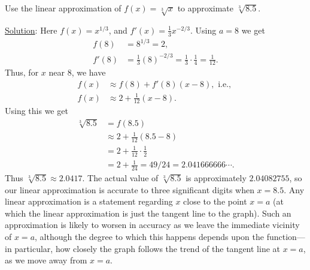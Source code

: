 \bex Use the linear approximation of $f(x)=\sqrt[3]{x}$ to
approximate $\sqrt[3]{8.5}$.

\underline{Solution}: Here $f(x)=x^{1/3}$, and $f'(x)=\frac13x^{-2/3}$.
Using $a=8$ we get 
\begin{align*}
f(8)&=8^{1/3}=2,\\ f'(8)&=\frac13(8)^{-2/3}=
   \frac13\cdot\frac14=\frac1{12}.\end{align*}
Thus, for $x$ near $8$, we have
\begin{align*}
  f(x)&\approx f(8)+f'(8)(x-8),\text{ i.e., }\\
  f(x)&\approx 2+\frac1{12}(x-8).\end{align*}
Using this we get
  \begin{align*}
\sqrt[3]{8.5}&=f(8.5)\\
          &\approx 2+\frac1{12}(8.5-8)\\
          &=2+\frac{1}{12}\cdot\frac12\\  
          &=2+\frac1{24}=49/24=2.041666666\cdots.\end{align*}
Thus $\sqrt[3]{8.5}\approx 2.0417$.
\eex
The actual value of $\sqrt[3]{8.5}$ is approximately $2.04082755$,
so our linear approximation is accurate to three significant digits
when $x=8.5$. Any linear approximation is a statement regarding
$x$ close to the point $x=a$ (at which the linear approximation is
just the tangent line to the graph).  Such an approximation is likely
to worsen in accuracy as we leave the immediate vicinity of $x=a$,
although the degree to which this happens depends upon the function---in
particular, how closely the graph follows the trend of the
tangent line at $x=a$, as we move
away from $x=a$.
 
